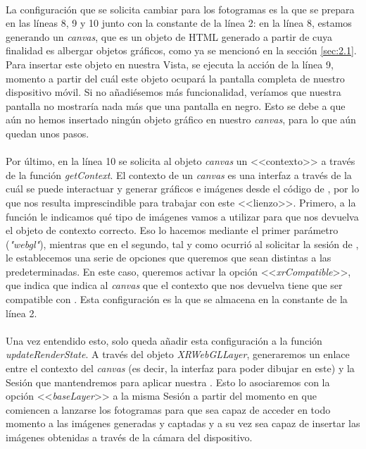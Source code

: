 \documentclass{subfiles}
\begin{document}
        \paragraph{}
        La configuración que se solicita cambiar para los fotogramas es la que se prepara en las líneas 8, 9 y 10 junto con la constante de la línea 2: en la línea  8, estamos generando un \textit{canvas}, que es un objeto de HTML generado a partir de \js cuya finalidad es albergar objetos gráficos, como ya se mencionó en la sección \ref{sec:2.1}. Para insertar este objeto en nuestra Vista, se ejecuta la acción de la línea 9, momento a partir del cuál este objeto ocupará la pantalla completa de nuestro dispositivo móvil. Si no añadiésemos más funcionalidad, veríamos que nuestra pantalla no mostraría nada más que una pantalla en negro. Esto se debe a que aún no hemos insertado ningún objeto gráfico en nuestro \textit{canvas}, para lo que aún quedan unos pasos.

        \paragraph{}
        Por último, en la línea 10 se solicita al objeto \textit{canvas} un <<contexto>> a través de la función \textit{getContext}. El contexto de un \textit{canvas} es una interfaz a través de la cuál se puede interactuar y generar gráficos e imágenes desde el código de \js \cite{web:canvascontext}, por lo que nos resulta imprescindible para trabajar con este <<lienzo>>. Primero, a la función le indicamos qué tipo de imágenes vamos a utilizar para que nos devuelva el objeto de contexto correcto. Eso lo hacemos mediante el primer parámetro (\textit{"webgl"}), mientras que en el segundo, tal y como ocurrió al solicitar la sesión de \webxr, le establecemos una serie de opciones que queremos que sean distintas a las predeterminadas. En este caso, queremos activar la opción <<\textit{xrCompatible}>>, que indica que indica al \textit{canvas} que el contexto que nos devuelva tiene que ser compatible con \webxr \cite{web:getcontext}. Esta configuración es la que se almacena en la constante de la línea 2.

        \paragraph{}
        Una vez entendido esto, solo queda añadir esta configuración a la función \textit{updateRenderState}. A través del objeto \textit{XRWebGLLayer}, generaremos un enlace entre el contexto del \textit{canvas} (es decir, la interfaz para poder dibujar en este) y la Sesión \webxr que mantendremos para aplicar nuestra \ra \cite{web:xrwebgllayer}. Esto lo asociaremos con la opción <<\textit{baseLayer}>> a la misma Sesión a partir del momento en que comiencen a lanzarse los fotogramas para que sea capaz de acceder en todo momento a las imágenes generadas y captadas y a su vez sea capaz de insertar las imágenes obtenidas a través de la cámara del dispositivo.
\end{document}
